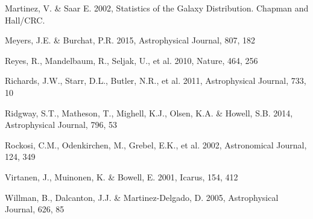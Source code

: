 \documentclass{iau}
\begin{document}
\begin{thebibliography}{}
\bibitem[()]{} Martinez, V. \& Saar E. 2002, Statistics of the Galaxy Distribution. Chapman and Hall/CRC.

\bibitem[()]{} Meyers, J.E. \& Burchat, P.R. 2015, Astrophysical Journal, 807, 182 

\bibitem[()]{} Reyes, R., Mandelbaum, R., Seljak, U., et al. 2010, Nature, 464, 256 

\bibitem[()]{} Richards, J.W., Starr, D.L., Butler, N.R., et al. 2011, Astrophysical Journal, 733, 10 

\bibitem[()]{} Ridgway, S.T., Matheson, T., Mighell, K.J., Olsen, K.A. \& Howell, S.B. 2014, Astrophysical Journal, 796, 53

\bibitem[()]{} Rockosi, C.M., Odenkirchen, M., Grebel, E.K., et al. 2002, Astronomical Journal, 124, 349

\bibitem[()]{} Virtanen, J., Muinonen, K. \& Bowell, E. 2001, Icarus, 154, 412

\bibitem[()]{} Willman, B., Dalcanton, J.J. \& Martinez-Delgado, D. 2005, Astrophysical Journal, 626, 85

\end{thebibliography}
\end{document}
